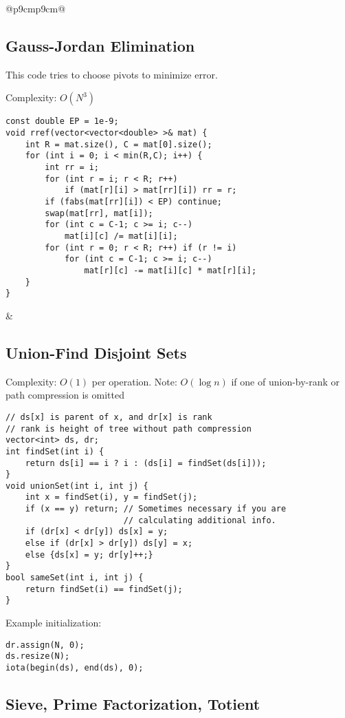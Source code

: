 \documentclass[letterpaper]{article}
\begin{document}
\begin{tabular}{@{}p{9cm}p{9cm}@{}}
\subsection{Gauss-Jordan Elimination}

This code tries to choose pivots to minimize error.

Complexity: $O\left(N^3\right)$

\begin{lstlisting}
const double EP = 1e-9;
void rref(vector<vector<double> >& mat) {
	int R = mat.size(), C = mat[0].size();
	for (int i = 0; i < min(R,C); i++) {
		int rr = i;
		for (int r = i; r < R; r++)
			if (mat[r][i] > mat[rr][i]) rr = r;
		if (fabs(mat[rr][i]) < EP) continue;
		swap(mat[rr], mat[i]);
		for (int c = C-1; c >= i; c--)
			mat[i][c] /= mat[i][i];
		for (int r = 0; r < R; r++) if (r != i)
			for (int c = C-1; c >= i; c--)
				mat[r][c] -= mat[i][c] * mat[r][i];
	}
}
\end{lstlisting}
&
\subsection{Union-Find Disjoint Sets}

Complexity: $O\left(1\right)$ per operation. Note: $O\left(\log n\right)$ if one of union-by-rank or path compression is omitted

\begin{lstlisting}
// ds[x] is parent of x, and dr[x] is rank
// rank is height of tree without path compression
vector<int> ds, dr;
int findSet(int i) {
	return ds[i] == i ? i : (ds[i] = findSet(ds[i]));
}
void unionSet(int i, int j) {
	int x = findSet(i), y = findSet(j);
	if (x == y) return; // Sometimes necessary if you are
	                    // calculating additional info.
	if (dr[x] < dr[y]) ds[x] = y;
	else if (dr[x] > dr[y]) ds[y] = x;
	else {ds[x] = y; dr[y]++;}
}
bool sameSet(int i, int j) {
	return findSet(i) == findSet(j);
}
\end{lstlisting}

Example initialization:

\begin{lstlisting}
dr.assign(N, 0);
ds.resize(N);
iota(begin(ds), end(ds), 0);
\end{lstlisting}
\end{tabular}

\clearpage
\subsection{Sieve, Prime Factorization, Totient}
\end{document}

